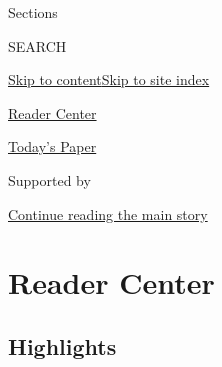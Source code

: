 Sections

SEARCH

\protect\hyperlink{site-content}{Skip to
content}\protect\hyperlink{site-index}{Skip to site index}

\href{https://www.nytimes.com/section/reader-center}{Reader Center}

\href{https://myaccount.nytimes.com/auth/login?response_type=cookie\&client_id=vi}{}

\href{https://www.nytimes.com/section/todayspaper}{Today's Paper}

Supported by

\protect\hyperlink{after-sponsor}{Continue reading the main story}

\hypertarget{reader-center}{%
\section{Reader Center}\label{reader-center}}

\hypertarget{highlights}{%
\subsection{Highlights}\label{highlights}}

